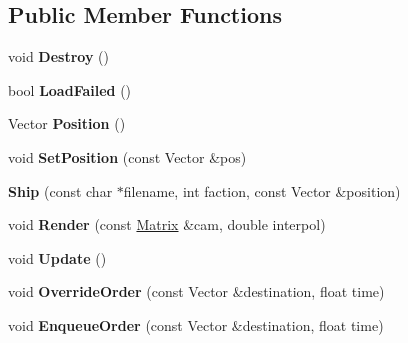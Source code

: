 \subsection*{Public Member Functions}
\begin{DoxyCompactItemize}
\item 
void {\bfseries Destroy} ()\hypertarget{classBriefing_1_1Ship_a201295048085d67eaa0d5dd189c1cceb}{}\label{classBriefing_1_1Ship_a201295048085d67eaa0d5dd189c1cceb}

\item 
bool {\bfseries Load\+Failed} ()\hypertarget{classBriefing_1_1Ship_a61cc3ed9f035bf8c879a4c804ba6381a}{}\label{classBriefing_1_1Ship_a61cc3ed9f035bf8c879a4c804ba6381a}

\item 
Vector {\bfseries Position} ()\hypertarget{classBriefing_1_1Ship_aaf764a0af9c795b786b73eb59d62f67b}{}\label{classBriefing_1_1Ship_aaf764a0af9c795b786b73eb59d62f67b}

\item 
void {\bfseries Set\+Position} (const Vector \&pos)\hypertarget{classBriefing_1_1Ship_adbc9640d466d0b0402de929657f95467}{}\label{classBriefing_1_1Ship_adbc9640d466d0b0402de929657f95467}

\item 
{\bfseries Ship} (const char $\ast$filename, int faction, const Vector \&position)\hypertarget{classBriefing_1_1Ship_aad07df3a63edd6cea99b6012d8c29d11}{}\label{classBriefing_1_1Ship_aad07df3a63edd6cea99b6012d8c29d11}

\item 
void {\bfseries Render} (const \hyperlink{classMatrix}{Matrix} \&cam, double interpol)\hypertarget{classBriefing_1_1Ship_a57c4605cef528d703b8eaa3568a54fd6}{}\label{classBriefing_1_1Ship_a57c4605cef528d703b8eaa3568a54fd6}

\item 
void {\bfseries Update} ()\hypertarget{classBriefing_1_1Ship_afa4cd4715d632eaa11f0e0ce37f4d9dc}{}\label{classBriefing_1_1Ship_afa4cd4715d632eaa11f0e0ce37f4d9dc}

\item 
void {\bfseries Override\+Order} (const Vector \&destination, float time)\hypertarget{classBriefing_1_1Ship_a2993cac24598c83b88ee937c7d8b8321}{}\label{classBriefing_1_1Ship_a2993cac24598c83b88ee937c7d8b8321}

\item 
void {\bfseries Enqueue\+Order} (const Vector \&destination, float time)\hypertarget{classBriefing_1_1Ship_a44f7b97468ce5cd82e1d0a9051aa8cdc}{}\label{classBriefing_1_1Ship_a44f7b97468ce5cd82e1d0a9051aa8cdc}

\end{DoxyCompactItemize}
